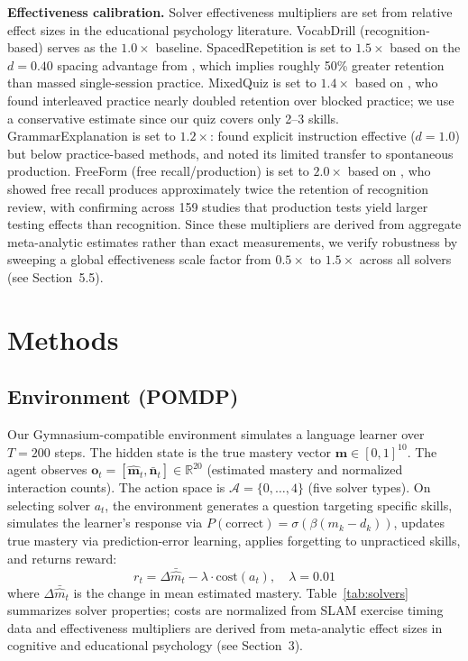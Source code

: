 \documentclass{article}
\begin{document}
\textbf{Effectiveness calibration.} Solver effectiveness multipliers are set from relative effect sizes in the educational psychology literature. VocabDrill (recognition-based) serves as the $1.0\times$ baseline. SpacedRepetition is set to $1.5\times$ based on the $d=0.40$ spacing advantage from \citet{cepeda2006spacing}, which implies roughly 50\% greater retention than massed single-session practice. MixedQuiz is set to $1.4\times$ based on \citet{rohrer2007interleaving}, who found interleaved practice nearly doubled retention over blocked practice; we use a conservative estimate since our quiz covers only 2--3 skills. GrammarExplanation is set to $1.2\times$: \citet{spada2010explicit} found explicit instruction effective ($d=1.0$) but below practice-based methods, and \citet{dekeyser2003implicit} noted its limited transfer to spontaneous production. FreeForm (free recall/production) is set to $2.0\times$ based on \citet{roediger2006power}, who showed free recall produces approximately twice the retention of recognition review, with \citet{rowland2014testing} confirming across 159 studies that production tests yield larger testing effects than recognition. Since these multipliers are derived from aggregate meta-analytic estimates rather than exact measurements, we verify robustness by sweeping a global effectiveness scale factor from $0.5\times$ to $1.5\times$ across all solvers (see Section~5.5).

\section{Methods}

\subsection{Environment (POMDP)}

Our Gymnasium-compatible environment simulates a language learner over $T=200$ steps. The hidden state is the true mastery vector $\mathbf{m} \in [0,1]^{10}$. The agent observes $\mathbf{o}_t = [\hat{\mathbf{m}}_t, \bar{\mathbf{n}}_t] \in \mathbb{R}^{20}$ (estimated mastery and normalized interaction counts). The action space is $\mathcal{A} = \{0,\ldots,4\}$ (five solver types). On selecting solver $a_t$, the environment generates a question targeting specific skills, simulates the learner's response via $P(\text{correct}) = \sigma(\beta(m_k - d_k))$, updates true mastery via prediction-error learning, applies forgetting to unpracticed skills, and returns reward:
\begin{equation}
    r_t = \Delta\bar{\hat{m}}_t - \lambda \cdot \text{cost}(a_t), \quad \lambda = 0.01
\end{equation}
where $\Delta\bar{\hat{m}}_t$ is the change in mean estimated mastery.
Table~\ref{tab:solvers} summarizes solver properties; costs are normalized from SLAM exercise timing data and effectiveness multipliers are derived from meta-analytic effect sizes in cognitive and educational psychology (see Section~3).
\end{document}
